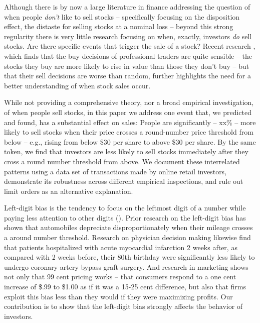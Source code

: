 Although there is by now a large literature in finance addressing the question of when people \textit{don't} like to sell stocks -- specifically focusing on the disposition effect, the distaste for selling stocks at a nominal loss -- beyond this strong regularity there is very little research focusing on when, exactly, investors \textit{do} sell stocks. Are there specific events that trigger the sale of a stock? 
Recent research \citep{akepanidtaworn2019selling}, which finds that the buy decisions of professional traders are quite sensible -- the stocks they buy are more likely to rise in value than those they don't buy -- but that their sell decisions are worse than random, further highlights the need for a better understanding of when stock sales occur. 

While not providing a comprehensive theory, nor a broad empirical investigation, of when people sell stocks, in this paper we address one event that, we predicted and found, has a substantial effect on sales: People are significantly -- xx\% -- more likely to sell stocks when their price crosses a round-number price threshold from below -- e.g., rising from below \$30 per share to above \$30 per share. By the same token, we find that investors are  less likely to sell stocks immediately after they cross a round number threshold from above.  We document these interrelated patterns using a data set of transactions made by online retail investors, demonstrate its robustness across different empirical inspections, and rule out limit orders as an alternative explanation. 

Left-digit bias is the tendency to focus on the leftmost digit of a number while paying less attention to other digits (\citealp{poltrock1984comparative}). Prior research on the left-digit bias has shown that automobiles depreciate disproportionately when their mileage crosses a around number threshold.  Research on physician decision making likewise find that patients hospitalized with acute myocardial infarction 2 weeks after, as compared with 2 weeks before, their 80th birthday were significantly less likely to undergo coronary-artery bypass graft surgery.  And research in marketing \citep{shlain2018more} shows not only that 99 cent pricing works -- that consumers respond to a one cent increase of \$.99 to \$1.00 as if it was a 15-25 cent difference, but also that firms exploit this bias less than they would if they were maximizing profits.  Our contribution is to show that the left-digit bias strongly affects the behavior of investors.



